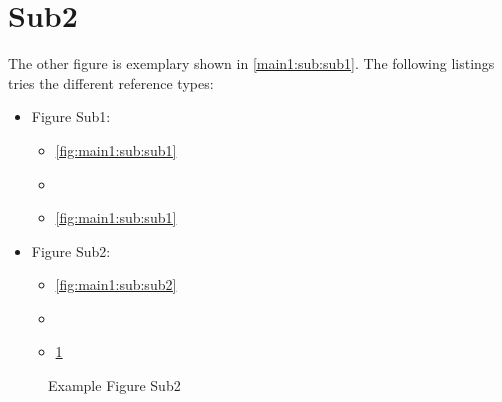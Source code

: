 \section[Sub2]{Sub2}\label{main1:sub:sub2}

The other figure is exemplary shown in \autoref{main1:sub:sub1}. The following listings tries the different reference types:
\begin{itemize}
    \item Figure Sub1:
        \begin{itemize}
            \item \autoref{fig:main1:sub:sub1}
            \item {}
            \item \ref{fig:main1:sub:sub1}
        \end{itemize}
    \item Figure Sub2:
        \begin{itemize}
            \item \autoref{fig:main1:sub:sub2}
            \item {}
            \item \ref{fig:main1:sub:sub2}
        \end{itemize}
\end{itemize}


\begin{figure}[!h]
    \caption[{Main1; Sub; Sub2}]{Example Figure Sub2}
    \label{fig:main1:sub:sub2}
\end{figure}

